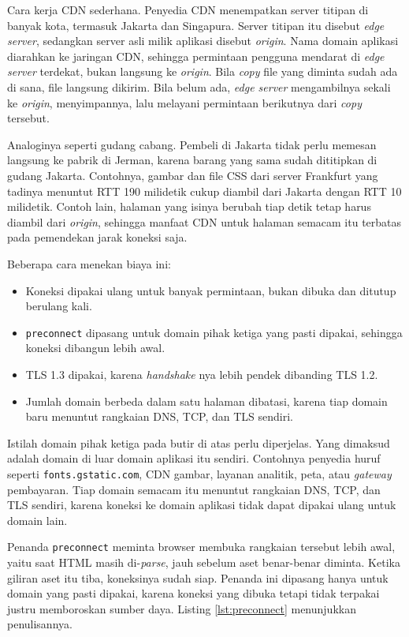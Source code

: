 Cara kerja CDN sederhana. Penyedia CDN menempatkan server titipan di banyak
kota, termasuk Jakarta dan Singapura. Server titipan itu disebut \textit{edge
server}, sedangkan server asli milik aplikasi disebut \textit{origin}. Nama
domain aplikasi diarahkan ke jaringan CDN, sehingga permintaan pengguna mendarat
di \textit{edge server} terdekat, bukan langsung ke \textit{origin}. Bila \textit{copy}
file yang diminta sudah ada di sana, file langsung dikirim. Bila belum ada,
\textit{edge server} mengambilnya sekali ke \textit{origin}, menyimpannya, lalu
melayani permintaan berikutnya dari \textit{copy} tersebut.

Analoginya seperti gudang cabang. Pembeli di Jakarta tidak perlu memesan
langsung ke pabrik di Jerman, karena barang yang sama sudah dititipkan di gudang
Jakarta. Contohnya, gambar dan file CSS dari server Frankfurt yang tadinya
menuntut RTT 190 milidetik cukup diambil dari Jakarta dengan RTT 10 milidetik.
Contoh lain, halaman yang isinya berubah tiap detik tetap harus diambil dari
\textit{origin}, sehingga manfaat CDN untuk halaman semacam itu terbatas pada
pemendekan jarak koneksi saja.

Beberapa cara menekan biaya ini:

\begin{itemize}
  \item Koneksi dipakai ulang untuk banyak permintaan, bukan dibuka dan ditutup
        berulang kali.
  \item \texttt{preconnect} dipasang untuk domain pihak ketiga yang pasti
        dipakai, sehingga koneksi dibangun lebih awal.
  \item TLS 1.3 \cite{rfc8446} dipakai, karena \textit{handshake} nya lebih pendek
        dibanding TLS 1.2.
  \item Jumlah domain berbeda dalam satu halaman dibatasi, karena tiap domain
        baru menuntut rangkaian DNS, TCP, dan TLS sendiri.
\end{itemize}

Istilah domain pihak ketiga pada butir di atas perlu diperjelas. Yang dimaksud
adalah domain di luar domain aplikasi itu sendiri. Contohnya penyedia huruf
seperti \texttt{fonts.gstatic.com}, CDN gambar, layanan analitik, peta, atau
\textit{gateway} pembayaran. Tiap domain semacam itu menuntut rangkaian DNS,
TCP, dan TLS sendiri, karena koneksi ke domain aplikasi tidak dapat dipakai
ulang untuk domain lain.

Penanda \texttt{preconnect} meminta browser membuka rangkaian tersebut lebih
awal, yaitu saat HTML masih di-\textit{parse}, jauh sebelum aset benar-benar
diminta. Ketika giliran aset itu tiba, koneksinya sudah siap. Penanda ini
dipasang hanya untuk domain yang pasti dipakai, karena koneksi yang dibuka
tetapi tidak terpakai justru memboroskan sumber daya. Listing
\ref{lst:preconnect} menunjukkan penulisannya.

